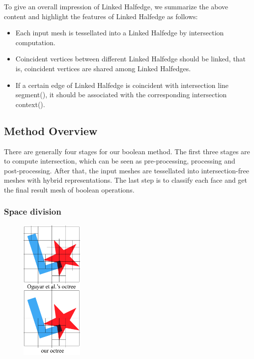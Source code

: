 \documentclass[10pt,journal,compsoc]{IEEEtran}
\begin{document}
To give an overall impression of Linked Halfedge, we summarize the above content and highlight the features of Linked Halfedge as follows:

\begin{itemize}
  \item Each input mesh is tessellated into a Linked Halfedge by intersection computation.
  \item Coincident vertices between different Linked Halfedge should be linked, that is, coincident vertices are shared among Linked Halfedges.
  \item If a certain edge of Linked Halfedge is coincident with intersection line segment(), it should be associated with the corresponding intersection context().
\end{itemize}

\fi
\subsection{Method Overview}

There are generally four stages for our boolean method. The first three stages are to compute intersection, which can be seen as pre-processing, processing and post-processing. After that, the input meshes are tessellated into intersection-free meshes with hybrid representations. The last step is to classify each face and get the final result mesh of boolean operations.

\subsubsection{Space division}


\begin{figure}
\includegraphics[width=1.2in]{octreediff}
\end{figure}
\end{document}
